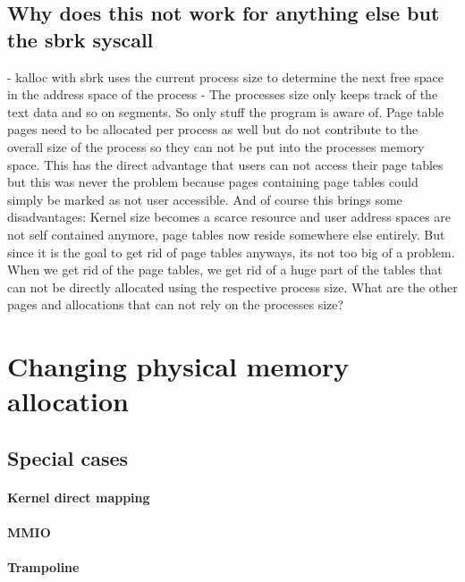 \subsection*{Why does this not work for anything else but the sbrk syscall}
- kalloc with sbrk uses the current process size to determine the next free space in
the address space of the process
- The processes size only keeps track of the text data and so on segments. So only stuff
the program is aware of. Page table pages need to be allocated per process as well but
do not contribute to the overall size of the process so they can not be put into the
processes memory space. This has the direct advantage that users can not access their page tables
but this was never the problem because pages containing page tables could simply be marked
as not user accessible. And of course this brings some disadvantages: Kernel size becomes
a scarce resource and user address spaces are not self contained anymore, page tables now reside
somewhere else entirely.
But since it is the goal to get rid of page tables anyways, its not too big of a problem.
When we get rid of the page tables, we get rid of a huge part of the tables that can not
be directly allocated using the respective process size.
What are the other pages and allocations that can not rely on the processes size?

\section{Changing physical memory allocation}
\subsection{Special cases}
\paragraph*{Kernel direct mapping}
\paragraph*{MMIO}
\paragraph*{Trampoline}

